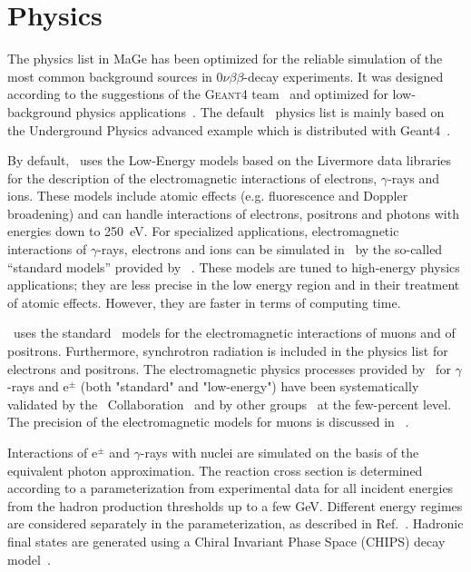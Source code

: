 \documentclass[article]{IEEEtran}
\begin{document}

\section{Physics} \label{section:physics}

The physics list in {\sc MaGe} has been optimized for the reliable
simulation of the most common background
sources in $0\nu\beta\beta$-decay experiments. It was designed
according to the suggestions of the \textsc{{\sc Geant4}}
team~\cite{physics_list} and optimized for
low-background physics
applications~\cite{Bauer:2004an,Pandola:2007}.
The default  \MaGe\ physics list is mainly based on the
Underground Physics advanced example which is distributed with {\sc
Geant4}~\cite{physics_list}.  


By default, \MaGe\ uses the Low-Energy models based on the Livermore data 
libraries~\cite{livermore1,livermore2} for the description of the electromagnetic 
interactions of electrons, $\gamma$-rays and ions. These models include atomic 
effects (e.g. fluorescence and Doppler broadening) and can handle interactions of electrons, positrons and photons 
with energies down to 250~eV. For specialized applications, electromagnetic interactions of $\gamma$-rays, 
electrons and ions can be simulated in \MaGe\ by the so-called ``standard models'' provided 
by \GF~\cite{physics-manual}. These models are tuned to high-energy physics applications; 
they are less precise in the low energy region and in their treatment of atomic effects. 
However, they are faster in terms of computing time.


\MaGe\ uses the standard \GF\ 
models for the electromagnetic interactions of muons and of positrons. 
Furthermore, synchrotron radiation is included in the physics list for electrons and positrons. 
The electromagnetic physics processes provided by \GF\ for $\gamma$-rays and e$^{\pm}$ 
(both "standard" and "low-energy") have been systematically validated by the 
\GF\ Collaboration~\cite{Amako:2005} and by other groups~\cite{Poon:2005} at the 
few-percent level. The precision of the electromagnetic models for muons is discussed 
in ~\cite{Bogdavov:2006}. 


Interactions of e$^{\pm}$ and $\gamma$-rays with nuclei are simulated on the basis of the 
equivalent photon approximation. The reaction cross section is determined according 
to a parameterization from experimental data for all incident energies from the hadron 
production thresholds up to a few GeV. Different energy regimes are considered separately 
in the parameterization, as described in Ref.~\cite{physics-manual}. Hadronic final 
states are generated using a Chiral Invariant Phase Space (CHIPS) decay 
model~\cite{chips3}. 
\end{document}
